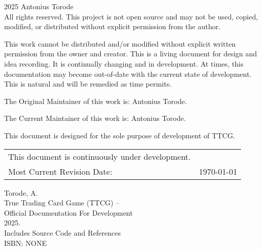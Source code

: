 \pagestyle{empty}
\begingroup
\footnotesize
\parindent 0pt
\parskip \baselineskip
\textcopyright{} 2025 Antonius Torode \\
All rights reserved. This project is not open source and may not be used, copied, modified, or distributed without explicit permission from the author.

This work cannot be distributed and/or modified without explicit written permission from the owner and creator. This is a living document for design and idea recording. It is continually changing and in development. At times, this documentation may become out-of-date with the current state of development. This is natural and will be remedied as time permits.

The Original Maintainer of this work is: Antonius Torode.

The Current Maintainer of this work is: Antonius Torode.

This document is designed for the sole purpose of development of TTCG.


\begin{center}
\begin{tabular}{ll}
This document is continuously under development. \\
Most Current Revision Date: &  \today 
\end{tabular}
\end{center}

\vfill

Torode, A.\\
\hspace*{2em} True Trading Card Game (TTCG) -- \\
\hspace*{2em} Official Documentation For Development \\
\hspace*{2em} 2025. \\
\hspace*{2em} Includes Source Code and References \\
\hspace*{2em} ISBN: NONE \\



\endgroup
\clearpage
